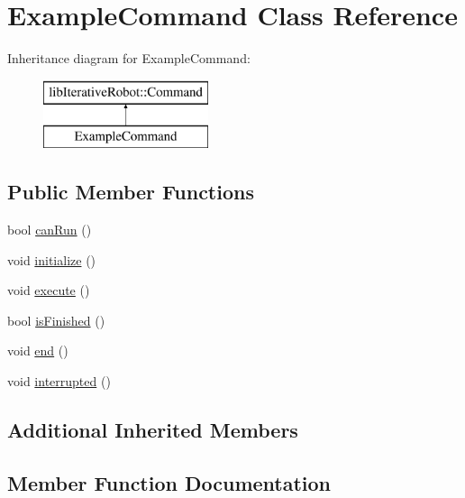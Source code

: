 \hypertarget{class_example_command}{}\section{Example\+Command Class Reference}
\label{class_example_command}
Inheritance diagram for Example\+Command\+:\begin{figure}[H]
\begin{center}
\leavevmode
\includegraphics[height=2.000000cm]{class_example_command}
\end{center}
\end{figure}
\subsection*{Public Member Functions}
\begin{DoxyCompactItemize}
\item 
bool \mbox{\hyperlink{class_example_command_ad1df0170d99bcef6c6bc1676551f9539}{can\+Run}} ()
\item 
void \mbox{\hyperlink{class_example_command_ae7bea17127c1697acbf90d6022eb5b5d}{initialize}} ()
\item 
void \mbox{\hyperlink{class_example_command_af6fead537dd568d80aa3097ca207eda5}{execute}} ()
\item 
bool \mbox{\hyperlink{class_example_command_ab4e52d526bda7fe22705b2d3c44286e0}{is\+Finished}} ()
\item 
void \mbox{\hyperlink{class_example_command_ac3da078fdf1e7a7f94488db815bb0457}{end}} ()
\item 
void \mbox{\hyperlink{class_example_command_ae5a4bb67aa6e6c6234c3dca8eb7ad7ec}{interrupted}} ()
\end{DoxyCompactItemize}
\subsection*{Additional Inherited Members}


\subsection{Member Function Documentation}
\mbox{\label{class_example_command_ad1df0170d99bcef6c6bc1676551f9539}} 
